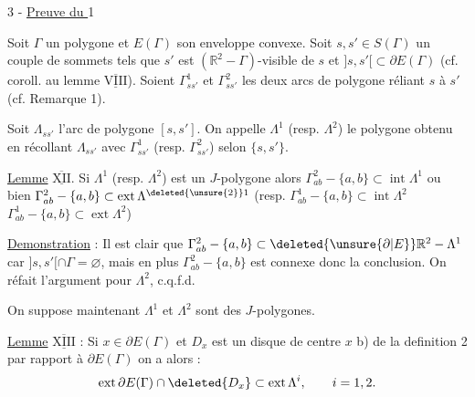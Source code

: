 3 - \uline{Preuve du } 1

\margin{!}Soit $\Gamma$ un polygone et $E(\Gamma)$ son enveloppe convexe. Soit $s,s'\in S(\Gamma)$ un couple de sommets  tels que $s'$ est $(\mathbb{R}^2-\Gamma)$-visible de $s$ et $]s,s'[\subset\partial E(\Gamma)$ (cf. coroll. au lemme $\underline{\overline{\mathrm{VIII}}}$). Soient $\Gamma^1_{ss'}$ et $\Gamma^2_{ss'}$ les deux arcs de polygone  réliant $s$ à $s'$ (cf. Remarque 1).
\margin{$\vert$}

Soit $\Lambda_{ss'}$ l'arc de polygone $[s,s']$. On appelle $\Lambda^1$ (resp. $\Lambda^2$) le polygone obtenu en récollant $\Lambda_{ss'}$ avec $\Gamma^1_{ss'}$ (resp. $\Gamma^2_{ss'}$) selon $\{s,s'\}$.

\uline{Lemme} $\underline{\overline{\mathrm{XII}}}$. Si $\Lambda^1$ (resp. $\Lambda^2$) est un $J$-polygone alors $\Gamma^2_{ab}-\{a,b\}\subset\operatorname{int}\Lambda^1$ ou bien $\Gamma^2_{ab}-\{a,b\}\subset\operatorname{ext}\Lambda^{\deleted{\unsure{2}}1}$ (resp. $\Gamma^1_{ab}-\{a,b\}\subset\operatorname{int}\Lambda^2$ $\Gamma^1_{ab}-\{a,b\}\subset\operatorname{ext}\Lambda^2$)

\uline{Demonstration} : Il est clair que $\Gamma^2_{ab}-\{a,b\}\subset\deleted{\unsure{\partial|E}}\mathbb{R}^2-\Lambda^1$ car $]s,s'[\cap\Gamma=\varnothing$, mais en plus $\Gamma^2_{ab}-\{a,b\}$ est connexe donc la conclusion. On réfait l'argument pour $\Lambda^2$, c.q.f.d.
\margin{$\vert$}\margin{$\vert$}

On suppose maintenant  $\Lambda^1$ et $\Lambda^2$  sont des $J$-polygones.

\uline{Lemme} $\underline{\overline{\mathrm{XIII}}}$ : Si $x\in\partial E(\Gamma)$ et $D_x$ est un disque de centre $x$  b) de la definition 2 par rapport à $\partial E(\Gamma)$ on a alors :
\[
\operatorname{ext}\partial E(\Gamma)\cap\deleted{D_x}\subset\operatorname{ext}\Lambda^i,\qquad i=1,2.
\]

